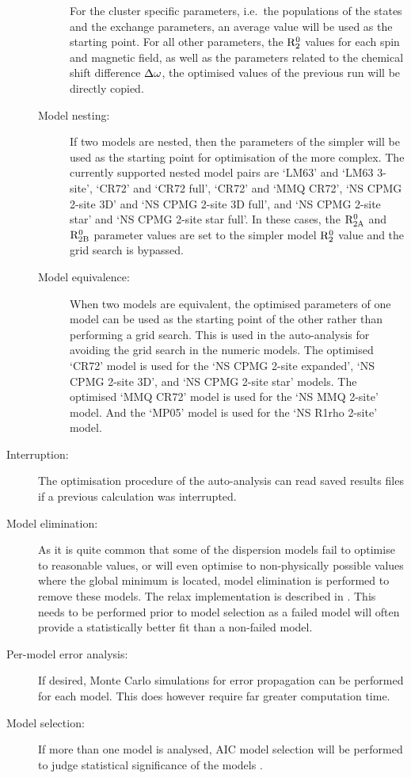 \begin{description}
\begin{description}
      For the cluster specific parameters, i.e.\ the populations of the states and the exchange parameters, an average value will be used as the starting point.
      For all other parameters, the $\mathrm{R}_2^0$ values for each spin and magnetic field, as well as the parameters related to the chemical shift difference $\Delta\omega$, the optimised values of the previous run will be directly copied.
    \item[Model nesting:]  If two models are nested, then the parameters of the simpler will be used as the starting point for optimisation of the more complex.
      The currently supported nested model pairs are `LM63' and `LM63 3-site', `CR72' and `CR72 full', `CR72' and `MMQ CR72', `NS CPMG 2-site 3D' and `NS CPMG 2-site 3D full', and `NS CPMG 2-site star' and `NS CPMG 2-site star full'.
      In these cases, the $\mathrm{R}_\mathrm{2A}^0$ and $\mathrm{R}_\mathrm{2B}^0$ parameter values are set to the simpler model $\mathrm{R}_2^0$ value and the grid search is bypassed.
    \item[Model equivalence:]  When two models are equivalent, the optimised parameters of one model can be used as the starting point of the other rather than performing a grid search.
      This is used in the auto-analysis for avoiding the grid search in the numeric models.
      The optimised `CR72' model is used for the `NS CPMG 2-site expanded', `NS CPMG 2-site 3D', and  `NS CPMG 2-site star' models.
      The optimised `MMQ CR72' model is used for the `NS MMQ 2-site' model.
      And the `MP05' model is used for the `NS R1rho 2-site' model.
  \end{description}
  \item[Interruption:]  The optimisation procedure of the auto-analysis can read saved results files if a previous calculation was interrupted.
  \item[Model elimination:]  As it is quite common that some of the dispersion models fail to optimise to reasonable values, or will even optimise to non-physically possible values where the global minimum is located, model elimination is performed to remove these models.
    The relax implementation is described in \citet{dAuvergneGooley06}.
    This needs to be performed prior to model selection as a failed model will often provide a statistically better fit than a non-failed model.
  \item[Per-model error analysis:]  If desired, Monte Carlo simulations for error propagation can be performed for each model.
    This does however require far greater computation time.
  \item[Model selection:]  If more than one model is analysed, AIC model selection will be performed to judge statistical significance of the models \citep{Akaike73}.

\end{description}
